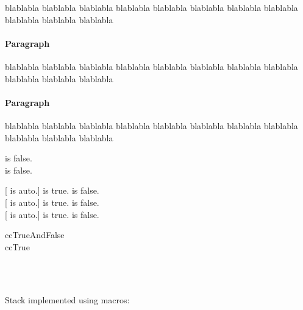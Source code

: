 \documentclass[12pt]{article}
\begin{document}
{\begin{lcHtmlBlock}
blablabla blablabla blablabla blablabla blablabla blablabla blablabla 
blablabla blablabla blablabla blablabla 

\paragraph*{Paragraph}

blablabla blablabla blablabla blablabla blablabla blablabla blablabla 
blablabla blablabla blablabla blablabla 

\paragraph[Bloek]{Paragraph}

blablabla blablabla blablabla blablabla blablabla blablabla blablabla 
blablabla blablabla blablabla blablabla 

\def\qtrue{\ccTrue}
\def\qfalse{\ccFalse}
\def\qauto{\ccAuto}
\newcommand{\qy}[1]{\lciIf{#1}{\lcAsciiToHtml{#1} is true.}
                              {\lcAsciiToHtml{#1} is false.}}

\newcommand{\qz}[1]{\lciIf{#1}[\lcAsciiToHtml{#1} is auto.]
                              {\lcAsciiToHtml{#1} is true.}
                              {\lcAsciiToHtml{#1} is false.}}

\qy\qtrue \\
\qy\qfalse

\qz\qtrue \\
\qz\qfalse\\
\qz\qauto

ccTrueAndFalse \\
ccTrue 

\\
\\





Stack implemented using macros:

\newcommand{\mystack}{}


\end{lcHtmlBlock}}
\end{document}
